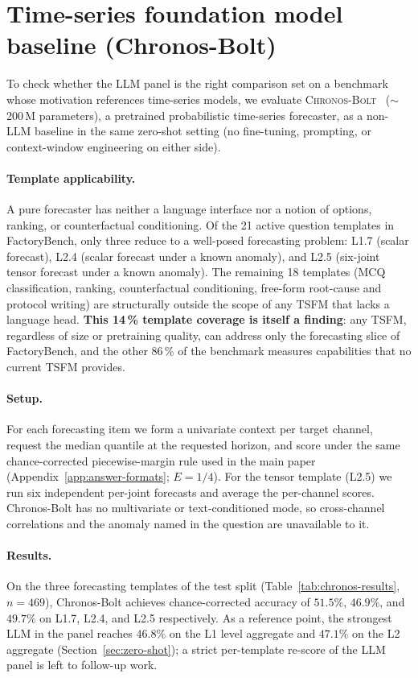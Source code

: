 \documentclass{article}
\begin{document}
\section{Time-series foundation model baseline (Chronos-Bolt)}
\label{app:chronos-baseline}

To check whether the LLM panel is the right comparison set on a benchmark whose motivation references time-series models, we evaluate \textsc{Chronos-Bolt}~\cite{ansari2024chronos} ($\sim$200\,M parameters), a pretrained probabilistic time-series forecaster, as a non-LLM baseline in the same zero-shot setting (no fine-tuning, prompting, or context-window engineering on either side).

\paragraph{Template applicability.} A pure forecaster has neither a language interface nor a notion of options, ranking, or counterfactual conditioning. Of the 21 active question templates in FactoryBench, only three reduce to a well-posed forecasting problem: L1.7 (scalar forecast), L2.4 (scalar forecast under a known anomaly), and L2.5 (six-joint tensor forecast under a known anomaly). The remaining 18 templates (MCQ classification, ranking, counterfactual conditioning, free-form root-cause and protocol writing) are structurally outside the scope of any TSFM that lacks a language head. \textbf{This 14\,\% template coverage is itself a finding}: any TSFM, regardless of size or pretraining quality, can address only the forecasting slice of FactoryBench, and the other 86\,\% of the benchmark measures capabilities that no current TSFM provides.

\paragraph{Setup.} For each forecasting item we form a univariate context per target channel, request the median quantile at the requested horizon, and score under the same chance-corrected piecewise-margin rule used in the main paper (Appendix~\ref{app:answer-formats}; $E=1/4$). For the tensor template (L2.5) we run six independent per-joint forecasts and average the per-channel scores. Chronos-Bolt has no multivariate or text-conditioned mode, so cross-channel correlations and the anomaly named in the question are unavailable to it.

\paragraph{Results.} On the three forecasting templates of the test split (Table~\ref{tab:chronos-results}, $n=469$), Chronos-Bolt achieves chance-corrected accuracy of $51.5\%$, $46.9\%$, and $49.7\%$ on L1.7, L2.4, and L2.5 respectively. As a reference point, the strongest LLM in the panel reaches $46.8\%$ on the L1 level aggregate and $47.1\%$ on the L2 aggregate (Section~\ref{sec:zero-shot}); a strict per-template re-score of the LLM panel is left to follow-up work.
\end{document}
